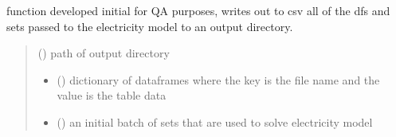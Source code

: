 \documentclass[letterpaper,10pt,english]{sphinxmanual}
\begin{document}

\begin{fulllineitems}
\label{\detokenize{src.models.electricity.scripts.preprocessor:src.models.electricity.scripts.preprocessor.output_inputs}}
\pysigstartsignatures
\pysiglinewithargsret
{}
{}
{}
\pysigstopsignatures
\sphinxAtStartPar
function developed initial for QA purposes, writes out to csv all of the dfs and sets passed
to the electricity model to an output directory.
\begin{quote}\begin{description}
\sphinxAtStartPar
{} () \textendash{} path of output directory

\sphinxAtStartPar
\begin{itemize}
\item {} 
\sphinxAtStartPar
{} () \textendash{} dictionary of dataframes where the key is the file name and the value is the table data

\item {} 
\sphinxAtStartPar
{} () \textendash{} an initial batch of sets that are used to solve electricity model

\end{itemize}


\end{description}\end{quote}

\end{fulllineitems}

\end{document}
